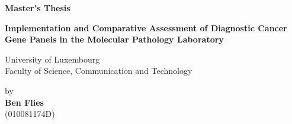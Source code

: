 \begin{center}

    {}\vspace{4cm}

    {\Large{\bf Master's Thesis}} \vspace{6cm}

    {\Large{\bf Implementation and Comparative Assessment of Diagnostic Cancer Gene Panels in the Molecular Pathology Laboratory}} \vspace{5cm}

    {\normalsize University of Luxembourg \\
    Faculty of Science, Communication and Technology
    } \vspace{5cm}

    {\normalsize by \\\vspace{2cm}
    {\bf Ben Flies} \\
    (010081174D)} \vspace{1cm}

\end{center}
